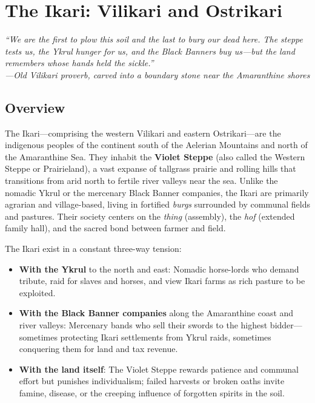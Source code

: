 \documentclass[12pt]{article}
\begin{document}
\thispagestyle{empty}

\section*{The Ikari: Vilikari and Ostrikari}
\textit{``We are the first to plow this soil and the last to bury our dead here. The steppe tests us, the Ykrul hunger for us, and the Black Banners buy us---but the land remembers whose hands held the sickle.''}\\[1em]
\textit{---Old Vilikari proverb, carved into a boundary stone near the Amaranthine shores}

\subsection{Overview}
The Ikari---comprising the western Vilikari and eastern Ostrikari---are the indigenous peoples of the continent south of the Aelerian Mountains and north of the Amaranthine Sea. They inhabit the \textbf{Violet Steppe} (also called the Western Steppe or Prairieland), a vast expanse of tallgrass prairie and rolling hills that transitions from arid north to fertile river valleys near the sea. Unlike the nomadic Ykrul or the mercenary Black Banner companies, the Ikari are primarily agrarian and village-based, living in fortified \textit{burgs} surrounded by communal fields and pastures. Their society centers on the \textit{thing} (assembly), the \textit{hof} (extended family hall), and the sacred bond between farmer and field.

The Ikari exist in a constant three-way tension: 
\begin{itemize}[leftmargin=*]
  \item \textbf{With the Ykrul} to the north and east: Nomadic horse-lords who demand tribute, raid for slaves and horses, and view Ikari farms as rich pasture to be exploited.
  \item \textbf{With the Black Banner companies} along the Amaranthine coast and river valleys: Mercenary bands who sell their swords to the highest bidder---sometimes protecting Ikari settlements from Ykrul raids, sometimes conquering them for land and tax revenue.
  \item \textbf{With the land itself}: The Violet Steppe rewards patience and communal effort but punishes individualism; failed harvests or broken oaths invite famine, disease, or the creeping influence of forgotten spirits in the soil.
\end{itemize}
\end{document}
